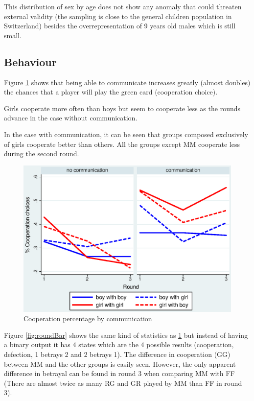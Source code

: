 \documentclass{article} %
\begin{document}
This distribution of sex by age does not show any anomaly that could threaten external validity (the sampling is close to the general children population in Switzerland) besides the overrepresentation of 9 years old males which is still small.

\subsection{Behaviour}
Figure \ref{fig:round} shows that being able to communicate increases greatly (almost doubles) the chances that a player will play the green card (cooperation choice). 

Girls cooperate more often than boys but seem to cooperate less as the rounds advance in the case without communication.

In the case with communication, it can be seen that groups composed exclusively of girls cooperate better than others. All the groups except MM cooperate less during the second round.

\begin{figure}[H]
\centering
\includegraphics[scale=.7]{inc/round.eps}
\caption{Cooperation percentage by communication}
\label{fig:round}
\end{figure}

Figure \ref{fig:roundBar} shows the same kind of statistics as  \ref{fig:round} but instead of having a binary output it has 4 states which are the 4 possible results (cooperation, defection, 1 betrays 2 and 2 betrays 1). The difference in cooperation (GG) between MM and the other groups is easily seen. However, the only apparent difference in betrayal can be found in round 3 when comparing MM with FF (There are almost twice as many RG and GR played by MM than FF in round 3).
\end{document}
